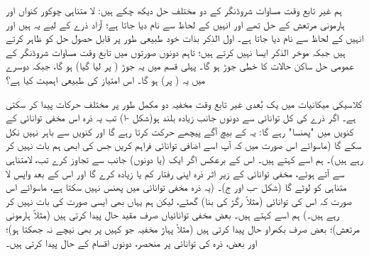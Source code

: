  ہم غیر تابع وقت مساوات شروڈنگر کے دو مختلف حل دیکھ چکے ہیں: لا متناہی چوکور کنواں اور ہارمونی مرتعش کے حل  تھے اور انہیں   کے لحاظ سے نام دیا جاتا ہے؛ آزاد ذرے کے لیے یہ  ہیں اور انہیں   کے لحاظ سے نام دیا جاتا ہے۔ اول الذکر بذات خود طبیعی طور پر قابل حصول حل کو ظاہر کرتے ہیں جبکہ موخر الذکر ایسا نہیں کرتے ہیں؛ تاہم دونوں صورتوں میں تابع وقت مساوات شروڈنگر کے عمومی حل ساکن حالات کا خطی جوڑ ہو گا۔ پہلی قسم میں یہ جوڑ ( پر لیا گیا)  ہو گا، جبکہ دوسرے میں یہ ( پر)  ہو گا۔ اس امتیاز کی طبیعی اہمیت کیا ہے؟

 کلاسیکی میکانیات میں یک بُعدی غیر تابع وقت مخفیہ دو مکمل طور پر مختلف حرکات پیدا کر سکتی ہے۔ اگر  ذرے کی کل توانائی  سے دونوں جانب زیادہ بلند ہو(شکل -ا) تب یہ ذرہ اس مخفی توانائی کے کنویں  میں "پھنسا" رہے گا: یہ  کے بیچ آگے پیچھے حرکت کرتا رہے گا اور کنویں  سے باہر نہیں نکل سکے گا (ماسوائے اس صورت میں کہ آپ اسے اضافی توانائی فراہم کریں جس کی ابھی ہم بات نہیں کر رہے ہیں)۔ ہم اسے  کہتے ہیں۔ اس کے برعکس اگر  ایک (یا دونوں) جانب  سے تجاوز کرے تب، لامتناہی سے آتے ہوئے، مخفی توانائی کے زیر اثر ذرہ اپنی رفتار کم یا زیادہ کرے گا اور اس کے بعد واپس لا متناہی کو لوٹے گا (شکل -ب اور ج)۔ (یہ ذرہ مخفی توانائی میں پھنس نہیں سکتا ہے، ماسوائے اس صورت کہ اس کی توانائی (مثلاً رگڑ کی بنا) گھٹے، لیکن ہم یہاں بھی ایسی صورت کی بات نہیں کر رہے ہیں۔) ہم اسے  کہتے ہیں۔ بعض مخفی توانائیاں صرف مقید حال پیدا کرتی ہیں (مثلاً ہارمونی مرتعش)؛ بعض صرف بکھراو حال پیدا کرتی ہیں (مثلاً پہاڑ مخفیہ جو کہیں پر بھی نیچے نہ جھکتا ہو)؛ اور بعض، ذرہ کی توانائی پر منحصر، دونوں اقسام کے حال پیدا کرتی ہیں۔

